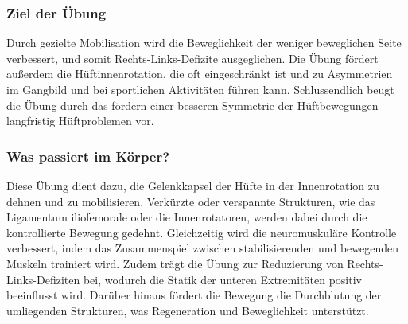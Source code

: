\subsubsection{Ziel der Übung}
Durch gezielte Mobilisation wird die Beweglichkeit der weniger beweglichen Seite verbessert, und somit Rechts-Links-Defizite ausgeglichen.
Die Übung fördert außerdem die Hüftinnenrotation, die oft eingeschränkt ist und zu Asymmetrien im Gangbild und bei sportlichen Aktivitäten führen kann.
Schlussendlich beugt die Übung durch das fördern einer besseren Symmetrie der Hüftbewegungen langfristig Hüftproblemen vor.


\subsubsection{Was passiert im Körper?}
Diese Übung dient dazu, die Gelenkkapsel der Hüfte in der Innenrotation zu dehnen und zu mobilisieren.
Verkürzte oder verspannte Strukturen, wie das Ligamentum iliofemorale oder die Innenrotatoren, werden dabei durch die kontrollierte Bewegung gedehnt.
Gleichzeitig wird die neuromuskuläre Kontrolle verbessert, indem das Zusammenspiel zwischen stabilisierenden und bewegenden Muskeln trainiert wird.
Zudem trägt die Übung zur Reduzierung von Rechts-Links-Defiziten bei, wodurch die Statik der unteren Extremitäten positiv beeinflusst wird.
Darüber hinaus fördert die Bewegung die Durchblutung der umliegenden Strukturen, was Regeneration und Beweglichkeit unterstützt.

